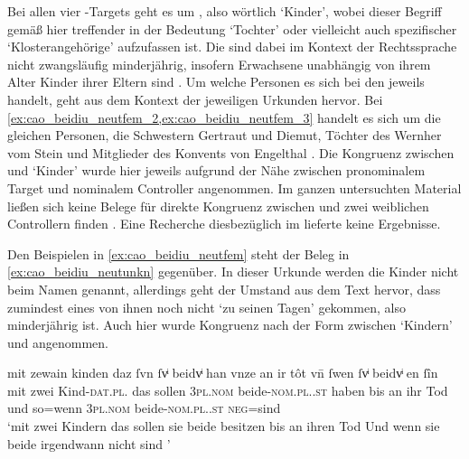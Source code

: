 Bei allen vier -Targets geht es um , also wörtlich
`Kinder', wobei dieser Begriff gemäß \citet[s.\,v.~]{lexer:mhdhwb}
hier treffender in der Bedeutung `Tochter'
 oder vielleicht
auch spezifischer `Klosterangehörige'
 aufzufassen ist.
Die  sind dabei im Kontext der Rechtssprache nicht zwangsläufig
minderjährig, insofern Erwachsene unabhängig von ihrem Alter Kinder ihrer
Eltern sind \autocites[vgl.][1736]{schwab2012}[siehe
auch][258--259]{birkenesfleischer2022}. Um welche Personen es sich bei den
 jeweils handelt, geht aus dem Kontext der jeweiligen Urkunden
hervor. Bei \cref{ex:cao_beidiu_neutfem_2,ex:cao_beidiu_neutfem_3} handelt es
sich um die gleichen Personen, die Schwestern Gertraut und Diemut, Töchter des
Wernher vom Stein und Mitglieder des Konvents von Engelthal
\autocite[Kr.~Nürnberger Land; vgl.][619]{caor}.
%
Die Kongruenz zwischen  und  `Kinder' wurde hier
jeweils aufgrund der Nähe zwischen pronominalem Target und nominalem Controller
angenommen. Im ganzen unter\-suchten Material ließen sich keine Belege für
direkte Kongruenz zwischen  und zwei weiblichen Controllern finden%
. Eine Recherche diesbezüglich im
\REM{} lieferte keine Ergeb\-nisse.

Den Beispielen in \cref{ex:cao_beidiu_neutfem} steht der Beleg in
\cref{ex:cao_beidiu_neutunkn} gegenüber. In dieser Urkunde werden die Kinder
nicht beim Namen genannt, allerdings geht der Umstand aus dem Text hervor, dass
zumindest eines von ihnen noch nicht  `zu seinen
Tagen' \autocites(Nr.~214)[218,18--19]{cao1}[vgl.][26]{caor} gekommen, also
minderjährig ist. Auch hier wurde Kongruenz nach der Form zwischen
 `Kindern' und  angenommen.

\begin{exe}
\ex \label{ex:cao_beidiu_neutunkn}
	\gll mit zewain kinden \textelp{} daz ſvn ſvͥ
		beidvͥ han vnze an ir tôt \textelp{} vn̄ ſwen
		ſvͥ beidvͥ {en ſîn}
		\textelp{} \\
		mit zwei Kind-\textsc{dat.pl.\NeutX} {} das sollen
		\textsc{3pl\subX.nom} beide-\textsc{nom.pl.\NeutX.st} haben bis an ihr
		Tod {} und so=wenn \textsc{3pl\subX.nom}
		beide-\textsc{nom.pl.\NeutX.st} \textsc{neg}=sind {} \\
	\trans `mit zwei Kindern \textelp{} das sollen sie beide besitzen
		bis an ihren Tod \textelp{} Und wenn sie beide irgendwann nicht
		 sind \textelp{}'
		\parencites(Nr.~214, Rottweil, 1274)[218.17--24]{cao1}
\end{exe}

